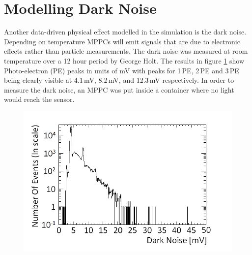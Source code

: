 \section{Modelling Dark Noise}\label{sec:GEANT4Simulation_ModellingDarkNoise}
Another data-driven physical effect modelled in the simulation is the dark noise. Depending on temperature MPPCs will emit signals that are due to electronic effects rather than particle measurements. The dark noise was measured at room temperature over a 12 hour period by George Holt. The results in figure \ref{fig:pureDarkNoise} show Photo-electron (PE) peaks in units of mV with peaks for 1\,PE, 2\,PE and 3\,PE being clearly visible at 4.1\,mV, 8.2\,mV, and 12.3\,mV respectively. In order to measure the dark noise, an MPPC was put inside a container where no light would reach the sensor. 
\begin{figure}[!h]
 \centering
 \includegraphics[width=0.7\linewidth]{Chapter4/Figs/Raster/pureDarkNoise_outputMedText.png}
 \label{fig:pureDarkNoise}
\end{figure}

